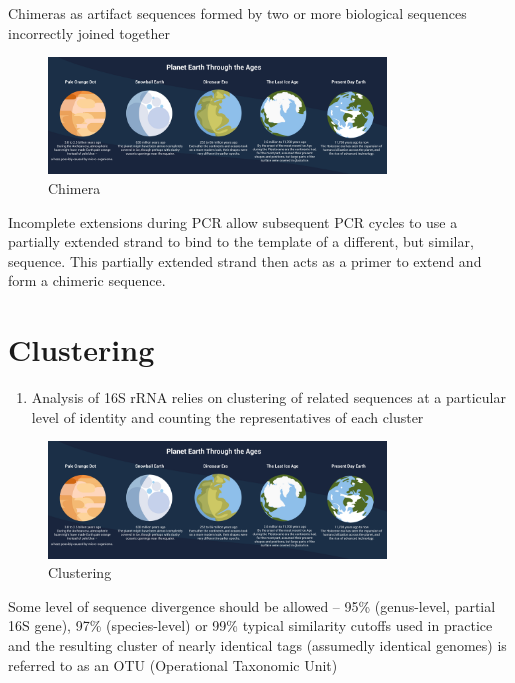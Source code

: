 \documentclass[
]{book}
\providecommand{\tightlist}{%
  \setlength{\itemsep}{0pt}\setlength{\parskip}{0pt}}
\begin{document}
Chimeras as artifact sequences formed by two or more biological sequences incorrectly joined together

\begin{figure}
\centering
\includegraphics[width=0.8\textwidth,height=\textheight]{./Figures/Planets.png}
\caption{Chimera}
\end{figure}

Incomplete extensions during PCR allow subsequent PCR cycles to use a partially extended strand to bind to the template of a different, but similar, sequence. This partially extended strand then acts as a primer to extend and form a chimeric sequence.

\hypertarget{clustering}{%
\section{Clustering}\label{clustering}}

\begin{enumerate}
\def\labelenumi{\arabic{enumi}.}
\tightlist
\item
  Analysis of 16S rRNA relies on clustering of related sequences at a particular level of identity and counting the representatives of each cluster
\end{enumerate}

\begin{figure}
\centering
\includegraphics[width=0.8\textwidth,height=\textheight]{./Figures/Planets.png}
\caption{Clustering}
\end{figure}

Some level of sequence divergence should be allowed -- 95\% (genus-level, partial 16S gene), 97\% (species-level) or 99\% typical similarity cutoffs used in
practice and the resulting cluster of nearly identical tags (assumedly identical genomes) is referred to as an OTU (Operational Taxonomic Unit)
\end{document}
